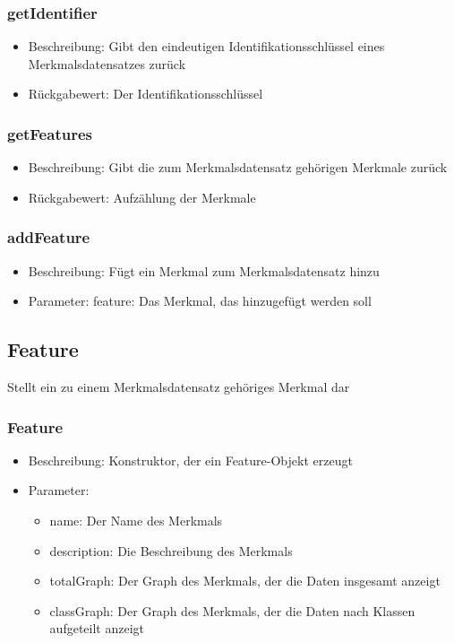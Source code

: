 \documentclass[a4paper]{scrreprt}
\begin{document}
	\subsubsection{getIdentifier}
	\begin{itemize}
		\item Beschreibung: Gibt den eindeutigen Identifikationsschlüssel eines Merkmalsdatensatzes zurück
		\item Rückgabewert: Der Identifikationsschlüssel
	\end{itemize}
	\subsubsection{getFeatures}
	\begin{itemize}
		\item Beschreibung: Gibt die zum Merkmalsdatensatz gehörigen Merkmale zurück
		\item Rückgabewert: Aufzählung der Merkmale
	\end{itemize}
	\subsubsection{addFeature}
	\begin{itemize}
	\item Beschreibung: Fügt ein Merkmal zum Merkmalsdatensatz hinzu
	\item Parameter: feature: Das Merkmal, das hinzugefügt werden soll
	\end{itemize}
	\subsection{Feature}
	Stellt ein zu einem Merkmalsdatensatz gehöriges Merkmal dar
	\subsubsection{Feature}
		\begin{itemize}
		\item Beschreibung: Konstruktor, der ein Feature-Objekt erzeugt
		\item Parameter:
		\begin{itemize}
		\item name: Der Name des Merkmals
		\item description: Die Beschreibung des Merkmals
		\item totalGraph: Der Graph des Merkmals, der die Daten insgesamt anzeigt
		\item classGraph: Der  Graph des Merkmals, der die Daten nach Klassen aufgeteilt anzeigt
		\end{itemize}
		\end{itemize}
\end{document}
